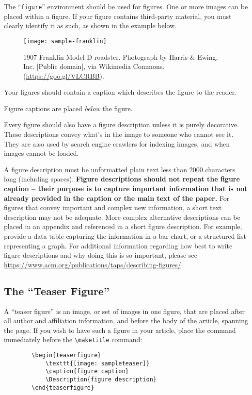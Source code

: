 \documentclass[acmsmall]{acmart}
\begin{document}
	The ``\verb|figure|'' environment should be used for figures. One or
	more images can be placed within a figure. If your figure contains
	third-party material, you must clearly identify it as such, as shown
	in the example below.
	\begin{figure}[h]
		\centering
		\texttt{[image: sample-franklin]}
		\caption{1907 Franklin Model D roadster. Photograph by Harris \&
			Ewing, Inc. [Public domain], via Wikimedia
			Commons. (\url{https://goo.gl/VLCRBB}).}
	\end{figure}
	
	Your figures should contain a caption which describes the figure to
	the reader.
	
	Figure captions are placed {\itshape below} the figure.
	
	Every figure should also have a figure description unless it is purely
	decorative. These descriptions convey what’s in the image to someone
	who cannot see it. They are also used by search engine crawlers for
	indexing images, and when images cannot be loaded.
	
	A figure description must be unformatted plain text less than 2000
	characters long (including spaces).  {\bfseries Figure descriptions
		should not repeat the figure caption – their purpose is to capture
		important information that is not already provided in the caption or
		the main text of the paper.} For figures that convey important and
	complex new information, a short text description may not be
	adequate. More complex alternative descriptions can be placed in an
	appendix and referenced in a short figure description. For example,
	provide a data table capturing the information in a bar chart, or a
	structured list representing a graph.  For additional information
	regarding how best to write figure descriptions and why doing this is
	so important, please see
	\url{https://www.acm.org/publications/taps/describing-figures/}.
	
	\subsection{The ``Teaser Figure''}
	
	A ``teaser figure'' is an image, or set of images in one figure, that
	are placed after all author and affiliation information, and before
	the body of the article, spanning the page. If you wish to have such a
	figure in your article, place the command immediately before the
	\verb|\maketitle| command:
	\begin{verbatim}
		\begin{teaserfigure}
			\texttt{[image: sampleteaser]}
			\caption{figure caption}
			\Description{figure description}
		\end{teaserfigure}
	\end{verbatim}
	
\end{document}
